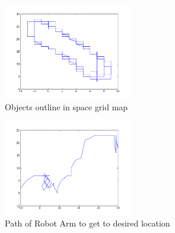 \begin{figure}[tbd]
\includegraphics[width=0.5\textwidth]{images/image.png}
\caption{\label{occupied} Objects outline in space grid map}
\end{figure}

\begin{figure}[tbd]
\includegraphics[width=0.5\textwidth]{images/image2.png}
\caption{\label{path} Path of Robot Arm to get to desired location}
\end{figure}